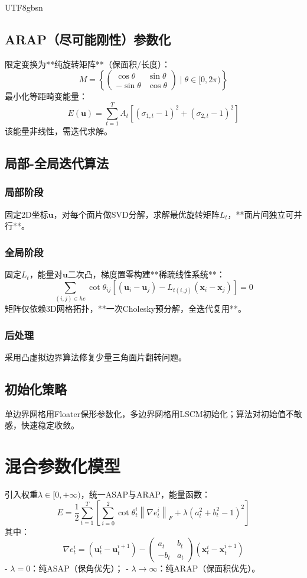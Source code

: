 \documentclass[10pt,a4paper,twocolumn]{article}
\newcommand{\fro}[1]{\left\|#1\right\|_F}
\begin{document}
\begin{CJK*}{UTF8}{gbsn}
\subsection{ARAP（尽可能刚性）参数化}
限定变换为**纯旋转矩阵**（保面积/长度）：
$$ M=\left\{ \begin{pmatrix}\cos\theta&\sin\theta\\-\sin\theta&\cos\theta\end{pmatrix} \mid \theta\in[0,2\pi) \right\} $$
最小化等距畸变能量：
\begin{equation}
E(\boldsymbol{u}) = \sum_{t=1}^T A_t \left[ (\sigma_{1,t}-1)^2 + (\sigma_{2,t}-1)^2 \right]
\end{equation}
该能量非线性，需迭代求解。

\subsection{局部-全局迭代算法}
\subsubsection{局部阶段}
固定2D坐标$\boldsymbol{u}$，对每个面片做SVD分解，求解最优旋转矩阵$L_t$，**面片间独立可并行**。
\subsubsection{全局阶段}
固定$L_t$，能量对$\boldsymbol{u}$二次凸，梯度置零构建**稀疏线性系统**：
$$ \sum_{(i,j)\in he} \cot\theta_{ij} \left[ (\boldsymbol{u}_i-\boldsymbol{u}_j) - L_{t(i,j)}(\boldsymbol{x}_i-\boldsymbol{x}_j) \right] = 0 $$
矩阵仅依赖3D网格拓扑，**一次Cholesky预分解，全迭代复用**。
\subsubsection{后处理}
采用凸虚拟边界算法修复少量三角面片翻转问题。

\subsection{初始化策略}
单边界网格用Floater保形参数化，多边界网格用LSCM初始化；算法对初始值不敏感，快速稳定收敛。

\section{混合参数化模型}
引入权重$\lambda\in[0,+\infty)$，统一ASAP与ARAP，能量函数：
\begin{equation}
E = \frac{1}{2}\sum_{t=1}^T\left[ \sum_{i=0}^2 \cot\theta_t^i \fro{\nabla e_t^i} + \lambda(a_t^2+b_t^2-1)^2 \right]
\end{equation}
其中：
$$ \nabla e_t^i = (\boldsymbol{u}_t^i-\boldsymbol{u}_t^{i+1}) - \begin{pmatrix}a_t&b_t\\-b_t&a_t\end{pmatrix}(\boldsymbol{x}_t^i-\boldsymbol{x}_t^{i+1}) $$
- $\lambda=0$：纯ASAP（保角优先）；
- $\lambda\to\infty$：纯ARAP（保面积优先）。


\end{CJK*}
\end{document}
